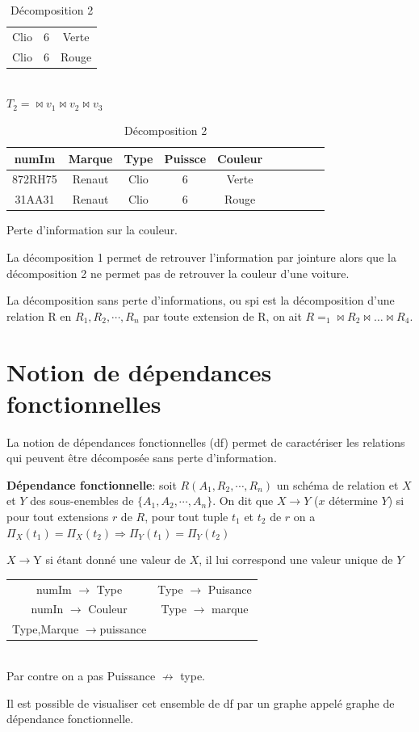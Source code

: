 \documentclass[12pt,a4paper,openany]{book}
\begin{document}
\begin{exemple}
\begin{table}[H]
\begin{tabular}{ccc}
					Clio & 6 & Verte\\
					Clio & 6 & Rouge\\
				\end{tabular} \\
				$T_2 = \bowtie v_1 \bowtie v_2 \bowtie v_3$\\
				\begin{tabular}{cccccccccc}
					\textbf{numIm} & \textbf{Marque} & \textbf{Type} & \textbf{Puissce} & \textbf{Couleur} \\
					\hline
					872RH75 & Renaut & Clio & 6 & Verte \\ 
					31AA31 & Renaut & Clio & 6 & Rouge\\
				\end{tabular}
				\caption{Décomposition 2}
			\end{table}
			Perte d'information sur la couleur.
		\end{exemple}
		La décomposition 1 permet de retrouver l'information par jointure alors que la décomposition 2 ne permet pas de retrouver la couleur d'une
		voiture.

		\begin{definition}
			La décomposition sans perte d'informations, ou spi est la décomposition d'une relation R en $R_1,R_2,\cdots,R_n$ par toute extension de R,
			on ait $R=_1\bowtie R_2\bowtie \ldots \bowtie R_4$.
		\end{definition}
		
		\section{Notion de dépendances fonctionnelles}
		La notion de dépendances fonctionnelles (df) permet de caractériser les relations qui peuvent être décomposée sans perte d'information.

		\begin{definition}
			\textbf{Dépendance fonctionnelle}: soit $R(A_1,R_2,\cdots,R_n)$ un schéma de relation et $X$ et $Y$ des sous-enembles de
			$\{A_1,A_2,\cdots,A_n\}$. On dit que $X\rightarrow Y$ ($x$ détermine $Y$) si pour tout extensions $r$ de $R$, pour tout tuple $t_1$ et
			$t_2$ de $r$ on a $\Pi_X(t_1) = \Pi_X(t_2) \Rightarrow \Pi_Y(t_1) = \Pi_Y(t_2)$
		\end{definition}
\begin{remarque}
	$X\rightarrow$Y si étant donné une valeur de $X$, il lui correspond une valeur unique de $Y$
\end{remarque}
		\begin{exemple}
			\begin{tabular}{cc}
				numIm $\rightarrow$ Type & Type $\rightarrow$ Puisance\\
				numIn $\rightarrow$ Couleur & Type $\rightarrow$ marque\\
				Type,Marque $\rightarrow $puissance
			\end{tabular}\\
			Par contre on a pas Puissance $\not\rightarrow$ type.

			Il est possible de visualiser cet ensemble de df par un graphe appelé graphe de dépendance fonctionnelle.
		\end{exemple}
\end{document}
